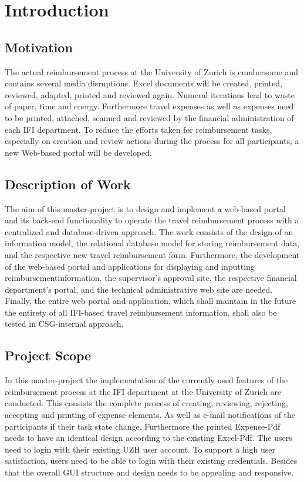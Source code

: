 \chapter{Introduction}

\section{Motivation}

The actual reimbursement process at the University of Zurich is cumbersome and contains several media disruptions. Excel documents will be created, printed, reviewed, adapted, printed and reviewed again. Numeral iterations lead to waste of paper, time and energy. Furthermore travel expenses as well as expenses need to be printed, attached, scanned and reviewed by the financial administration of each IFI \cite{ifi} department. To reduce the efforts taken for reimbursement tasks, especially on creation and review actions during the process for all participants, a new Web-based portal will be developed.

\section{Description of Work}

The aim of this master-project is to design and implement a web-based portal and its back-end functionality to operate the travel reimbursement process with a centralized and database-driven approach. The work consists of the design of an information model, the relational database model for storing reimbursement data, and the respective new travel reimbursement form. Furthermore, the development of the web-based portal and applications for displaying and inputting reimbursementinformation, the supervisor’s approval site, the respective financial department’s portal, and the technical administrative web site are needed. Finally, the entire web portal and application, which shall maintain in the future the entirety of all IFI-based travel reimbursement information, shall also be tested in CSG-internal approach.


\section{Project Scope}

In this master-project the implementation of the currently used features of the reimbursement process at the IFI department at the University of Zurich are conducted. This consists the complete process of creating, reviewing, rejecting, accepting and printing of expense elements. As well as e-mail notifications of the participants if their task state change. Furthermore the printed Expense-Pdf needs to have an identical design according to the existing Excel-Pdf.\newline 
The users need to login with their existing UZH user account. To support a high user satisfaction, users need to be able to login with their existing credentials. Besides that the overall GUI structure and design needs to be appealing and responsive.